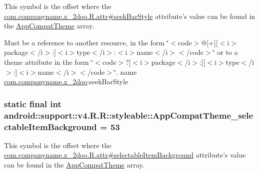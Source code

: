 This symbol is the offset where the \hyperlink{classcom_1_1companyname_1_1x__2doo_1_1_r_1_1attr_390aff9fb9a7a940c92f6a1029753237}{com.companyname.x\_\-2doo.R.attr\#seekBarStyle} attribute's value can be found in the \hyperlink{classandroid_1_1support_1_1v4_1_1_r_1_1styleable_0873e92ba21076bb5a4aeadeb7f5779f}{AppCompatTheme} array.

Must be a reference to another resource, in the form \char`\"{}$<$code$>$@\mbox{[}+\mbox{]}\mbox{[}$<$i$>$package$<$/i$>$:\mbox{]}$<$i$>$type$<$/i$>$:$<$i$>$name$<$/i$>$$<$/code$>$\char`\"{} or to a theme attribute in the form \char`\"{}$<$code$>$?\mbox{[}$<$i$>$package$<$/i$>$:\mbox{]}\mbox{[}$<$i$>$type$<$/i$>$:\mbox{]}$<$i$>$name$<$/i$>$$<$/code$>$\char`\"{}.  name \hyperlink{namespacecom_1_1companyname_1_1x__2doo}{com.companyname.x\_\-2doo}:seekBarStyle \hypertarget{classandroid_1_1support_1_1v4_1_1_r_1_1styleable_ca3ef3993e097a2b6d8407610c33068d}{
\subsubsection[{AppCompatTheme\_\-selectableItemBackground}]{\setlength{\rightskip}{0pt plus 5cm}static final int android::support::v4.R.R::styleable::AppCompatTheme\_\-selectableItemBackground = 53}}
\label{classandroid_1_1support_1_1v4_1_1_r_1_1styleable_ca3ef3993e097a2b6d8407610c33068d}


This symbol is the offset where the \hyperlink{classcom_1_1companyname_1_1x__2doo_1_1_r_1_1attr_f3fe2239b6e4cd57138b9d64e849ae62}{com.companyname.x\_\-2doo.R.attr\#selectableItemBackground} attribute's value can be found in the \hyperlink{classandroid_1_1support_1_1v4_1_1_r_1_1styleable_0873e92ba21076bb5a4aeadeb7f5779f}{AppCompatTheme} array.

